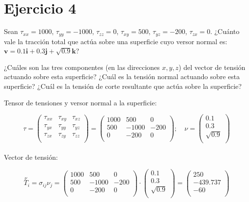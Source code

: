 \documentclass[a4paper,12pt,twoside,final,spanish]{article}
\begin{document}
\section*{Ejercicio 4}

Sean $\tau_{xx}=1000$, $\tau_{yy}=-1000$, $\tau_{zz}=0$, $\tau_{xy}=500$, $\tau_{yz}=-200$, $\tau_{zx}=0$. ¿Cuánto vale la tracción total que actúa sobre una superficie cuyo versor normal es: $\mathbf{v}=0.1\mathbf{i}+0.3\mathbf{j}+\sqrt{0.9}\mathbf{k}$?

¿Cuáles son las tres componentes (en las direcciones $x,y,z$) del vector de tensión
actuando sobre esta superficie? ¿Cuál es la tensión normal actuando sobre esta superficie? ¿Cuál es la tensión de corte resultante que actúa sobre la superficie?

\dotfill

Tensor de tensiones y versor normal a la superficie:

\[
\tau=\left(\begin{matrix}
\tau_{xx} & \tau_{xy} & \tau_{xz} \\
\tau_{yx} & \tau_{yy} & \tau_{yz} \\
\tau_{zx} & \tau_{zy} & \tau_{zz} \\
\end{matrix}\right)=
\left(\begin{matrix}
1000 & 500 & 0 \\
500 & -1000 & -200 \\
0 & -200 & 0 \\
\end{matrix}\right);\quad
\nu=\left(\begin{matrix}
0.1 \\
0.3 \\
\sqrt{0.9} \\
\end{matrix}\right)
\]\\

Vector de tensión:

\[
\stackrel \nu T_{i}=\sigma_{ij}\nu_{j}=
\left(\begin{matrix}
1000 & 500 & 0 \\
500 & -1000 & -200 \\
0 & -200 & 0 \\
\end{matrix}\right)\cdot
\left(\begin{matrix}
0.1 \\
0.3 \\
\sqrt{0.9} \\
\end{matrix}\right)=
\left(\begin{matrix}
250 \\
-439.737 \\
-60 \\
\end{matrix}\right)
\]\\
\end{document}
